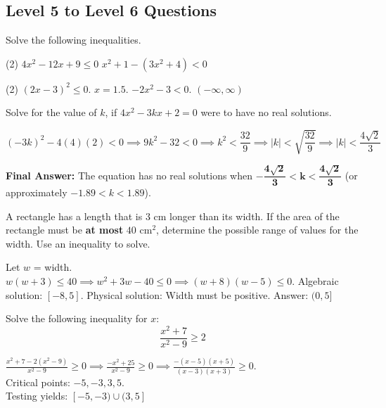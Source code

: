 \documentclass[12pt]{exam}
\begin{document}
\begin{questions}
\subsection*{Level 5 to Level 6 Questions}
\question Solve the following inequalities.
\begin{tasks}(2)
    \task $4x^2-12x+9\leq0$ \task $x^2+1-(3x^2+4)<0$
\end{tasks}
\begin{solution}
\begin{tasks}(2)
    \task $(2x-3)^2 \leq 0$. $x = 1.5$.
    \task $-2x^2 - 3 < 0$. $(-\infty, \infty)$
\end{tasks}
\end{solution}
\svert
\question Solve for the value of $k$, if $4x^2-3kx+2=0$ were to have no real solutions.
\begin{solution}
    \[ (-3k)^2 - 4(4)(2) < 0 \implies 9k^2 - 32 < 0 \implies  k^2 < \frac{32}{9} \implies |k| < \sqrt{\frac{32}{9}}\implies |k| < \frac{4\sqrt{2}}{3} \]

    \textbf{Final Answer:} The equation has no real solutions when $\mathbf{-\dfrac{4\sqrt{2}}{3} < k < \dfrac{4\sqrt{2}}{3}}$ 
    (or approximately $-1.89 < k < 1.89$).
\end{solution}
\svert
\pagebreak
\question A rectangle has a length that is $3$ cm longer than its width. If the area of the rectangle must be \textbf{at most} $40$ cm$^2$, determine the possible range of values for the width. Use an inequality to solve.
\begin{solution}
    Let $w$ = width. $w(w+3) \leq 40 \implies w^2+3w-40 \leq 0 \implies (w+8)(w-5) \leq 0$.
    Algebraic solution: $[-8, 5]$. Physical solution: Width must be positive. Answer: $(0, 5]$
\end{solution}
\svert[2]

\question Solve the following inequality for $x$:
\[ \dfrac{x^2 + 7}{x^2 - 9} \geq 2 \]
\begin{solution}
    $\frac{x^2 + 7 - 2(x^2 - 9)}{x^2 - 9} \geq 0 \implies \frac{-x^2 + 25}{x^2 - 9} \geq 0 \implies \frac{-(x-5)(x+5)}{(x-3)(x+3)} \geq 0$. \\
    Critical points: $-5, -3, 3, 5$. \\
    Testing yields: $[-5, -3) \cup (3, 5]$
\end{solution}
\svert[2]

\pagebreak

\end{questions}
\end{document}
